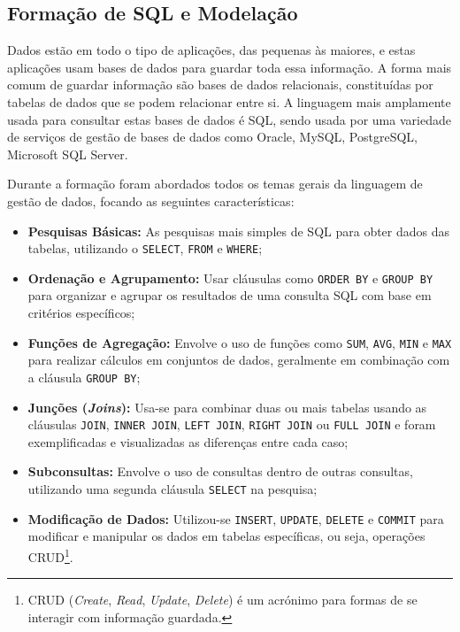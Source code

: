     \subsection{Formação de SQL e Modelação}\label{subsec:sqlmodelacao}

      Dados estão em todo o tipo de aplicações, das pequenas às maiores, e estas aplicações usam bases de dados para guardar toda essa informação. A forma mais comum de guardar informação são bases de dados relacionais, constituídas por tabelas de dados que se podem relacionar entre si\cite{welcome-to-sql}. A linguagem mais amplamente usada para consultar estas bases de dados é SQL, sendo usada por uma variedade de serviços de gestão de bases de dados como Oracle, MySQL, PostgreSQL, Microsoft SQL Server\cite{sql-vs-mysql}.

      Durante a formação foram abordados todos os temas gerais da linguagem de gestão de dados, focando as seguintes características:

      \begin{itemize}
          \item \textbf{Pesquisas Básicas:} As pesquisas mais simples de SQL para obter dados das tabelas, utilizando o \texttt{SELECT}, \texttt{FROM} e \texttt{WHERE};
          
          \item \textbf{Ordenação e Agrupamento:} Usar cláusulas como \texttt{ORDER BY} e \texttt{GROUP BY} para organizar e agrupar os resultados de uma consulta SQL com base em critérios específicos;
          
          \item \textbf{Funções de Agregação:} Envolve o uso de funções como \texttt{SUM}, \texttt{AVG}, \texttt{MIN} e \texttt{MAX} para realizar cálculos em conjuntos de dados, geralmente em combinação com a cláusula \texttt{GROUP BY};
          
          \item \textbf{Junções (\textit{Joins}):} Usa-se para combinar duas ou mais tabelas usando as cláusulas \texttt{JOIN}, \texttt{INNER JOIN}, \texttt{LEFT JOIN}, \texttt{RIGHT JOIN} ou \texttt{FULL JOIN} e foram exemplificadas e visualizadas as diferenças entre cada caso;
          
          \item \textbf{Subconsultas:} Envolve o uso de consultas dentro de outras consultas, utilizando uma segunda cláusula \texttt{SELECT} na pesquisa;
          
          \item \textbf{Modificação de Dados:} Utilizou-se \texttt{INSERT}, \texttt{UPDATE}, \texttt{DELETE} e \texttt{COMMIT} para modificar e manipular os dados em tabelas específicas, ou seja, operações CRUD\footnote{CRUD (\textit{Create}, \textit{Read}, \textit{Update}, \textit{Delete}) é um acrónimo para formas de se interagir com informação guardada.}.
      \end{itemize}
    
